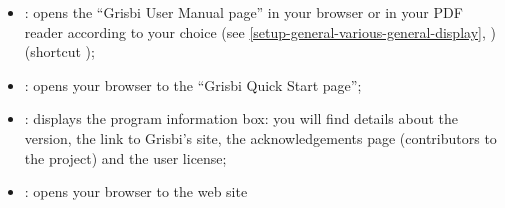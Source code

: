 \vspace{3mm}
\noindent
\begin{minipage}{.7\linewidth}
	\begin{itemize}[rightmargin=.6cm]
		\item {}: opens the \enquote{Grisbi User Manual page} in your browser or in your \gls{PDF} reader according to your choice (see \vref{setup-general-various-general-display}, )(shortcut ); 
		\item {}: opens your browser to the \enquote{Grisbi Quick Start page};
		\item {}: displays the program information box: you will find details about the version, the link to Grisbi's site, the acknowledgements page (contributors to the project) and the user license;
		\item {}: opens your browser to the \footnotemark web site
	\end{itemize}
\end{minipage}
\hspace{10pt}	
